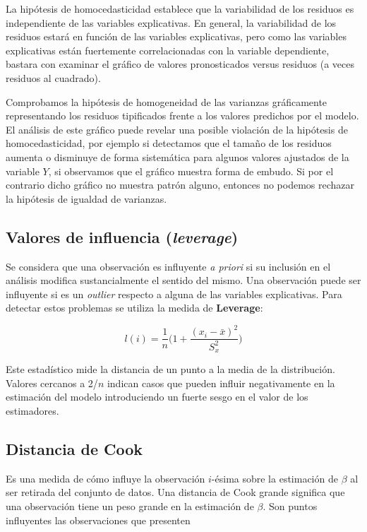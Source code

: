 \documentclass[
  spanish,
  a4paper,
]{scrbook}
\begin{document}
La hipótesis de homocedasticidad establece que la variabilidad de los
residuos es independiente de las variables explicativas. En general, la
variabilidad de los residuos estará en función de las variables
explicativas, pero como las variables explicativas están fuertemente
correlacionadas con la variable dependiente, bastara con examinar el
gráfico de valores pronosticados versus residuos (a veces residuos al
cuadrado).

Comprobamos la hipótesis de homogeneidad de las varianzas gráficamente
representando los residuos tipificados frente a los valores predichos
por el modelo. El análisis de este gráfico puede revelar una posible
violación de la hipótesis de homocedasticidad, por ejemplo si detectamos
que el tamaño de los residuos aumenta o disminuye de forma sistemática
para algunos valores ajustados de la variable \(Y\), si observamos que
el gráfico muestra forma de embudo. Si por el contrario dicho gráfico no
muestra patrón alguno, entonces no podemos rechazar la hipótesis de
igualdad de varianzas.

\subsection{\texorpdfstring{Valores de influencia
(\emph{leverage})}{Valores de influencia (leverage)}}\label{valores-de-influencia-leverage}

Se considera que una observación es influyente \emph{a priori} si su
inclusión en el análisis modifica sustancialmente el sentido del mismo.
Una observación puede ser influyente si es un \emph{outlier} respecto a
alguna de las variables explicativas. Para detectar estos problemas se
utiliza la medida de \textbf{Leverage}:

\[ 
l(i)=\frac{1}{n}\bigg(1+\frac{(x_i-\bar{x})^2}{S^2_x}\bigg)  
\]

Este estadístico mide la distancia de un punto a la media de la
distribución. Valores cercanos a 2/\(n\) indican casos que pueden
influir negativamente en la estimación del modelo introduciendo un
fuerte sesgo en el valor de los estimadores.

\subsection{Distancia de Cook}\label{distancia-de-cook}

Es una medida de cómo influye la observación \(i\)-ésima sobre la
estimación de \(\beta\) al ser retirada del conjunto de datos. Una
distancia de Cook grande significa que una observación tiene un peso
grande en la estimación de \(\beta\). Son puntos influyentes las
observaciones que presenten
\end{document}
